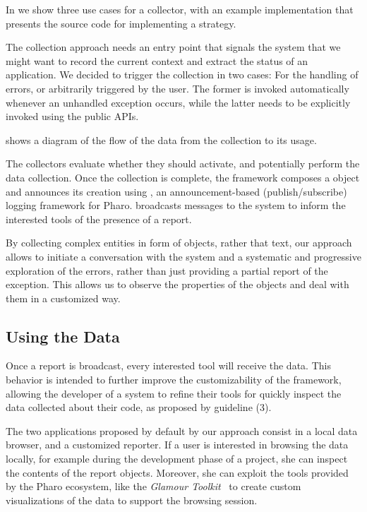 
In  we show three use cases for a collector, with an example implementation that presents the source code for implementing a strategy.

The collection approach needs an entry point that signals the system that we might want to record the current context and extract the status of an application. We decided to trigger the collection in two cases: For the handling of errors, or arbitrarily triggered by the user.
The former is invoked automatically whenever an unhandled exception occurs, while the latter needs to be explicitly invoked using the \sln public APIs.

 shows a diagram of the flow of the data from the collection to its usage.

The collectors evaluate whether they should activate, and potentially perform the data collection. Once the collection is complete, the framework composes a  object and announces its creation using \bea, an announcement-based (\ie publish/subscribe) logging framework for Pharo. \bea broadcasts messages to the system to inform the interested tools of the presence of a report.

By collecting complex entities in form of objects, rather that text, our approach allows to initiate a conversation with the system and a systematic and progressive exploration of the errors, rather than just providing a partial report of the exception. This allows us to observe the properties of the objects and deal with them in a customized way.

\subsection{Using the Data}\label{sec:tools}

Once a report is broadcast, every interested tool will receive the data. This behavior is intended to further improve the customizability of the framework, allowing the developer of a system to refine their tools for quickly inspect the data collected about their code, as proposed by guideline (3).

The two applications proposed by default by our approach consist in a local data browser, and a customized reporter. If a user is interested in browsing the data locally, for example during the development phase of a project, she can inspect the contents of the report objects.
Moreover, she can exploit the tools provided by the Pharo ecosystem, like the \emph{Glamour Toolkit}~\cite{Girb2013a} to create custom visualizations of the data to support the browsing session.


